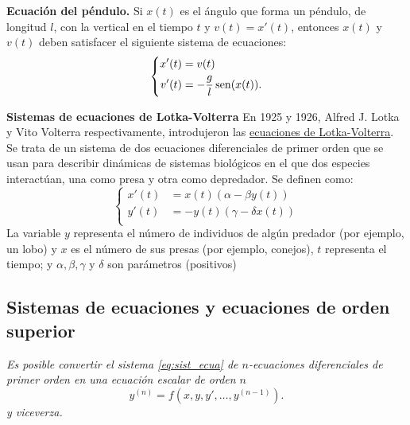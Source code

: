 \begin{ejemplo} \textbf{Ecuación del péndulo.} Si $x(t)$ es el ángulo que forma un péndulo, de longitud $l$, con la vertical en el tiempo $t$ y $v(t)=x'(t)$, entonces $x(t)$ y$v(t)$ deben satisfacer el siguiente sistema de  ecuaciones:
\begin{equation}\label{eq:sist_pend}
\left\{
\begin{split}
 x'(t)&=v(t)\\
  v'(t)&=-\frac{g}{l}\sen(x(t)).\\
\end{split}\right.
\end{equation}


\end{ejemplo}


\begin{ejemplo} \textbf{Sistemas de ecuaciones de Lotka-Volterra}
 En 1925 y 1926, Alfred J. Lotka y Vito Volterra respectivamente, introdujeron
 las \href{https://es.wikipedia.org/wiki/Ecuaciones_Lotka%E2%80%93Volterra}{ecuaciones de Lotka-Volterra}\link.   Se trata de un sistema de dos ecuaciones diferenciales de primer orden que se usan para describir dinámicas de sistemas biológicos en el que dos especies interactúan, una como presa y otra como depredador. Se definen como:
\begin{equation}\label{eq:lotka_volterra}
\left\{
\begin{split}
 x'(t) &= x(t) ( \alpha − \beta  y(t) )\\
  y'(t)&=-y(t)(\gamma-\delta x(t))\\
\end{split}\right.
\end{equation}
La variable $y$ representa el número de individuos de algún predador (por ejemplo, un lobo) y $x$ es el número de sus presas (por ejemplo, conejos), $t$ representa el tiempo; y  $\alpha,\beta,\gamma$ y $\delta$ son parámetros (positivos)

\end{ejemplo}


\subsection{Sistemas de ecuaciones y ecuaciones de orden superior}

\emph{Es posible convertir el sistema \eqref{eq:sist_ecua} de $n$-ecuaciones diferenciales de primer orden  en una ecuación escalar de orden $n$
\begin{equation}\label{eq:orden_n}
y^{(n)}=f(x,y,y',\ldots,y^{(n-1)}).
\end{equation}
y viceverza.}

